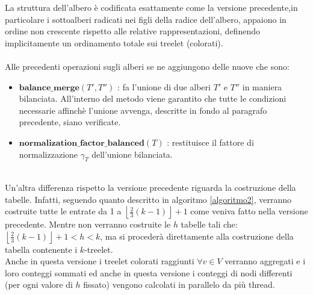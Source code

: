 La struttura dell'albero \`e codificata esattamente come la versione precedente,in particolare i sottoalberi radicati nei figli della radice dell'albero, appaiono in ordine non crescente rispetto alle relative rappresentazioni, definendo implicitamente un ordinamento totale sui treelet (colorati).\\\\
Alle precedenti operazioni sugli alberi se ne aggiungono delle nuove che sono:
\begin{itemize}
	\item $ \textbf{balance\_merge}(T',T'') $ : fa l'unione di due alberi $ T' $ e $ T'' $ in maniera bilanciata.
	All'interno del metodo viene garantito che tutte le condizioni necessarie affinch\`e l'unione avvenga, descritte in fondo al paragrafo precedente, siano verificate.
	\item $ \textbf{normalization\_factor\_balanced}(T) $ : restituisce il fattore di normalizzazione $ \gamma_T $ dell'unione bilanciata.
\end{itemize}\mbox{}\\
Un'altra differenza rispetto la versione precedente riguarda la costruzione della tabelle.
Infatti, seguendo quanto descritto in algoritmo \ref{algoritmo2}, verranno costruite tutte le entrate da 1 a  $ \left\lfloor \frac{2}{3}(k-1) \right\rfloor +1 $ come veniva fatto nella versione precedente.
Mentre non verranno costruite le $ h $ tabelle tali che: $ \left\lfloor \frac{2}{3}(k-1) \right\rfloor +1 < h < k $, ma si proceder\`a direttamente alla costruzione della tabella contenente i $ k $-treelet.\\
Anche in questa versione i treelet colorati raggiunti $ \forall v \in V $ verranno aggregati e i loro conteggi sommati ed anche in questa versione i conteggi di nodi differenti  (per ogni valore di $ h $ fissato) vengono calcolati in parallelo da pi\`u thread.

